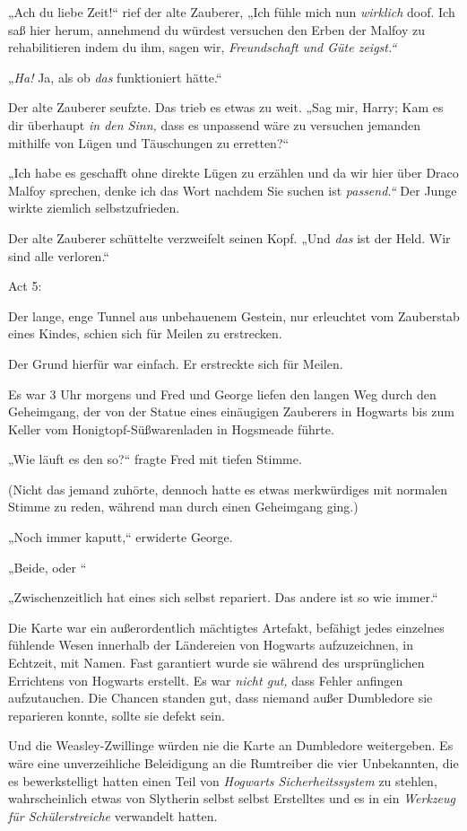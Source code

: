 {„Ach du liebe Zeit!“ rief der alte Zauberer, „Ich fühle mich nun \emph{wirklich} doof. Ich saß hier herum, annehmend du würdest versuchen den Erben der Malfoy zu rehabilitieren indem du ihm, sagen wir, \emph{Freundschaft und Güte zeigst.“}

„\emph{Ha!} Ja, als ob \emph{das} funktioniert hätte.“

Der alte Zauberer seufzte. Das trieb es etwas zu weit. „Sag mir, Harry; Kam es dir überhaupt \emph{in den Sinn,} dass es unpassend wäre zu versuchen jemanden mithilfe von Lügen und Täuschungen zu erretten?“

„Ich habe es geschafft ohne direkte Lügen zu erzählen und da wir hier über Draco Malfoy sprechen, denke ich das Wort nachdem Sie suchen ist \emph{passend.“} Der Junge wirkte ziemlich selbstzufrieden.

Der alte Zauberer schüttelte verzweifelt seinen Kopf. „Und \emph{das} ist der Held. Wir sind alle verloren.“

Act 5:

Der lange, enge Tunnel aus unbehauenem Gestein, nur erleuchtet vom Zauberstab eines Kindes, schien sich für Meilen zu erstrecken.

Der Grund hierfür war einfach. Er erstreckte sich für Meilen.

Es war 3 Uhr morgens und Fred und George liefen den langen Weg durch den Geheimgang, der von der Statue eines einäugigen Zauberers in Hogwarts bis zum Keller vom Honigtopf-Süßwarenladen in Hogsmeade führte.

„Wie läuft es den so?“ fragte Fred mit tiefen Stimme.

(Nicht das jemand zuhörte, dennoch hatte es etwas merkwürdiges mit normalen Stimme zu reden, während man durch einen Geheimgang ging.)

„Noch immer kaputt,“ erwiderte George.

„Beide, oder \later“

„Zwischenzeitlich hat eines sich selbst repariert. Das andere ist so wie immer.“

Die Karte war ein außerordentlich mächtigtes Artefakt, befähigt jedes einzelnes fühlende Wesen innerhalb der Ländereien von Hogwarts aufzuzeichnen, in Echtzeit, mit Namen. Fast garantiert wurde sie während des ursprünglichen Errichtens von Hogwarts erstellt. Es war \emph{nicht gut,} dass Fehler anfingen aufzutauchen. Die Chancen standen gut, dass niemand außer Dumbledore sie reparieren konnte, sollte sie defekt sein.

Und die Weasley-Zwillinge würden nie die Karte an Dumbledore weitergeben. Es wäre eine unverzeihliche Beleidigung an die Rumtreiber \later die vier Unbekannten, die es bewerkstelligt hatten einen Teil von \emph{Hogwarts Sicherheitssystem} zu stehlen, wahrscheinlich etwas von Slytherin selbst selbst Erstelltes und es in ein \emph{Werkzeug für Schülerstreiche} verwandelt hatten.

}
